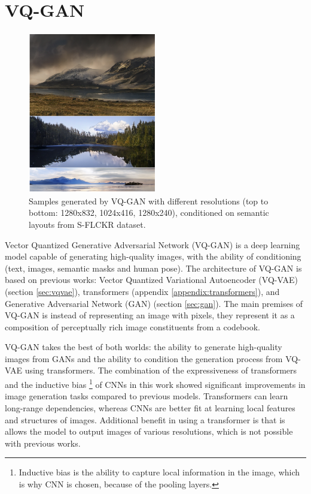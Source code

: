 \section{VQ-GAN}
\label{sec:vqgan}

\begin{figure}
    \centering
    \includegraphics[width=0.5\textwidth]{images/vqgan_samples.png}
    \caption{Samples generated by VQ-GAN with different resolutions (top to bottom: 1280x832, 1024x416, 1280x240), conditioned on semantic layouts from S-FLCKR dataset.}
\end{figure}

Vector Quantized Generative Adversarial Network (VQ-GAN) \cite{vqgan} is a deep learning model capable of generating high-quality images, with the ability of conditioning (text, images, semantic masks and human pose). The architecture of VQ-GAN is based on previous works: Vector Quantized Variational Autoencoder (VQ-VAE) \cite{vqvae} (section \ref{sec:vqvae}), transformers \cite{transformer} (appendix \ref{appendix:transformers}), and Generative Adversarial Network (GAN) \cite{gan} (section \ref{sec:gan}). The main premises of VQ-GAN is instead of representing an image with pixels, they represent it as a composition of perceptually rich image constituents from a codebook.

VQ-GAN takes the best of both worlds: the ability to generate high-quality images from GANs and the ability to condition the generation process from VQ-VAE using transformers. The combination of the expressiveness of transformers and the inductive bias \footnote[1]{Inductive bias is the ability to capture local information in the image, which is why CNN is chosen,  because of the pooling layers.} of CNNs \cite{cnn} in this work showed significant improvements in image generation tasks compared to previous models. Transformers can learn long-range dependencies, whereas CNNs are better fit at learning local features and structures of images. Additional benefit in using a transformer is that is allows the model to output images of various resolutions, which is not possible with previous works.

